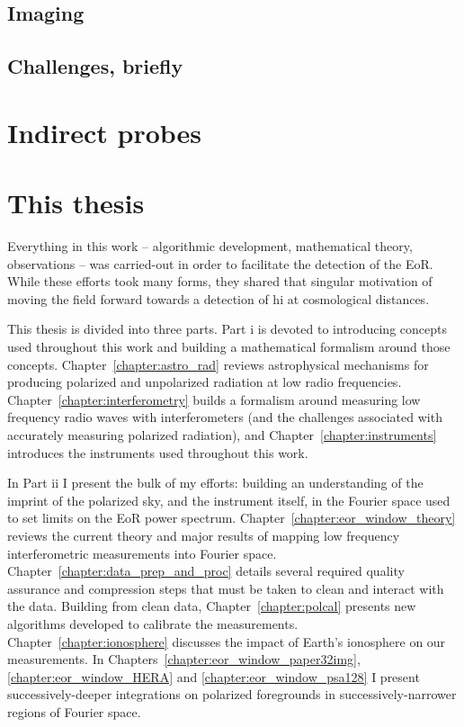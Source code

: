 \subsection{Imaging}
\subsection{Challenges, briefly}

\section{Indirect probes}





\section{This thesis}

Everything in this work -- algorithmic development, mathematical theory, observations -- was carried-out in order to facilitate the detection of the EoR. While these efforts took many forms, they shared that singular motivation of moving the field forward towards a detection of {\sc hi} at cosmological distances. 

This thesis is divided into three parts. Part {\sc i} is devoted to introducing concepts used throughout this work and building a mathematical formalism around those concepts. 
Chapter~\ref{chapter:astro_rad} reviews astrophysical mechanisms for producing polarized and unpolarized radiation at low radio frequencies. 
Chapter~\ref{chapter:interferometry} builds a formalism around measuring low frequency radio waves with interferometers (and the challenges associated with accurately measuring polarized radiation), and Chapter~\ref{chapter:instruments} introduces the instruments used throughout this work.

In Part {\sc ii} I present the bulk of my efforts: building an understanding of the imprint of the polarized sky, and the instrument itself, in the Fourier space used to set limits on the EoR power spectrum. 
Chapter~\ref{chapter:eor_window_theory} reviews the current theory and major results of mapping low frequency interferometric measurements into Fourier space. 
Chapter~\ref{chapter:data_prep_and_proc} details several required quality assurance and compression steps that must be taken to clean and interact with the data. Building from clean data, Chapter~\ref{chapter:polcal} presents new algorithms developed to calibrate the measurements.
Chapter~\ref{chapter:ionosphere} discusses the impact of Earth's ionosphere on our measurements.
In Chapters~\ref{chapter:eor_window_paper32img}, \ref{chapter:eor_window_HERA} and \ref{chapter:eor_window_psa128} I present successively-deeper integrations on polarized foregrounds in successively-narrower regions of Fourier space.

